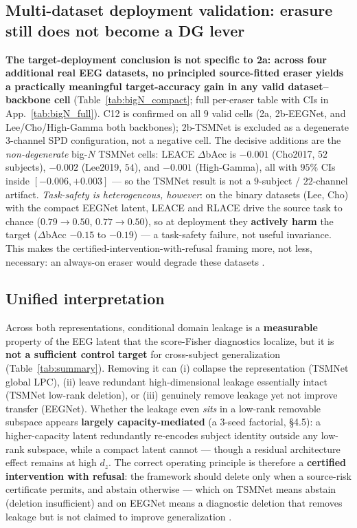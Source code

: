 \subsection{Multi-dataset deployment validation: erasure still does not become a DG lever}
\textbf{The target-deployment conclusion is not specific to 2a: across four additional real EEG datasets, no
principled source-fitted eraser yields a practically meaningful target-accuracy gain in any valid
dataset--backbone cell} (Table~\ref{tab:bigN_compact}; full per-eraser table with CIs in
App.~\ref{tab:bigN_full}). C12 is confirmed on all $9$ valid cells (2a, 2b-EEGNet, and Lee/Cho/High-Gamma both
backbones); 2b-TSMNet is excluded as a degenerate $3$-channel SPD configuration, not a negative cell. The
decisive additions are the \emph{non-degenerate} big-$N$ TSMNet cells: LEACE $\Delta$bAcc is $-0.001$
(Cho2017, $52$ subjects), $-0.002$ (Lee2019, $54$), and $-0.001$ (High-Gamma), all with $95\%$ CIs inside
$[-0.006,+0.003]$ --- so the TSMNet result is not a $9$-subject / $22$-channel artifact. \emph{Task-safety is heterogeneous, however}: on the binary datasets (Lee, Cho) with the compact
EEGNet latent, LEACE and RLACE drive the source task to chance ($0.79\to0.50$, $0.77\to0.50$), so at deployment
they \textbf{actively harm} the target ($\Delta$bAcc $-0.15$ to $-0.19$) --- a task-safety failure, not useful
invariance. This makes the certified-intervention-with-refusal framing more, not less, necessary: an always-on
eraser would degrade these datasets .



\subsection{Unified interpretation}
Across both representations, conditional domain leakage is a \textbf{measurable} property of the EEG latent that
the score-Fisher diagnostics localize, but it is \textbf{not a sufficient control target} for cross-subject
generalization (Table~\ref{tab:summary}). Removing it can (i) collapse the representation (TSMNet global LPC), (ii) leave
redundant high-dimensional leakage essentially intact (TSMNet low-rank deletion), or (iii) genuinely
remove leakage yet not improve transfer (EEGNet). Whether the leakage even \emph{sits} in a low-rank removable
subspace appears \textbf{largely capacity-mediated} (a 3-seed factorial, \S4.5): a higher-capacity latent
redundantly re-encodes subject identity outside any low-rank subspace, while a compact latent cannot ---
though a residual architecture effect remains at high $d_z$. The correct operating principle is therefore a \textbf{certified intervention with refusal}: the
framework should delete only when a source-risk certificate permits, and abstain otherwise --- which on
TSMNet means abstain (deletion insufficient) and on EEGNet means a diagnostic deletion that removes leakage
but is not claimed to improve generalization .

